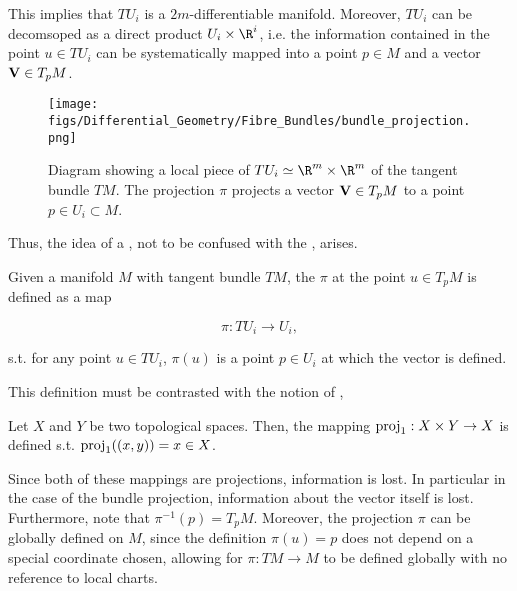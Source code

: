 This implies that $TU_i$ is a $2m$-differentiable manifold. 
Moreover, $TU_i$ can be decomsoped as a direct product $U_i \times \R^i$, i.e. the information contained in the point $u \in TU_i$ can be systematically mapped into a point $p \in M$ and a vector ${\bf V} \in T_p M$. \medbreak

\begin{wrapfigure}{l}{0.3\textwidth}
\texttt{[image: figs/Differential\_Geometry/Fibre\_Bundles/bundle\_projection.png]}
\caption{Diagram showing a local piece of $TU_i \simeq \R^m \times \R^m$ of the tangent bundle $TM$. The projection $\pi$ projects a vector ${\bf V} \in T_p M$ to a point $p \in U_i \subset M$.}
\end{wrapfigure} 

Thus, the idea of a , not to be confused with the , arises. 

\begin{df}
    Given a manifold $M$ with tangent bundle $TM$, the  $\pi$ at the point $u \in T_pM$ is defined as a map

    $$
        \pi: TU_i \rightarrow U_i, 
    $$

    s.t. for any point $u \in TU_i$, $\pi(u)$ is a point $p \in U_i$ at which the vector is defined. 
\end{df}

This definition must be contrasted with the notion of ,

\begin{df}
    Let $X$ and $Y$ be two topological spaces. Then, the  mapping $\textnormal{proj}_1: X \times Y \rightarrow X$ is defined s.t. $\textnormal{proj}_1( (x,y) ) = x \in X$.
\end{df}

\clearpage

\begin{remark}
Since both of these mappings are projections, information is lost. In particular in the case of the bundle projection, information about the vector itself is lost. 
Furthermore, note that $\pi^{-1}(p) = T_p M$. Moreover, the projection $\pi$ can be globally defined on $M$, since the definition $\pi(u) = p$ does not depend on a special coordinate chosen, allowing for $\pi: TM \rightarrow M$ to be defined globally with no reference to local charts. 

\end{remark}

